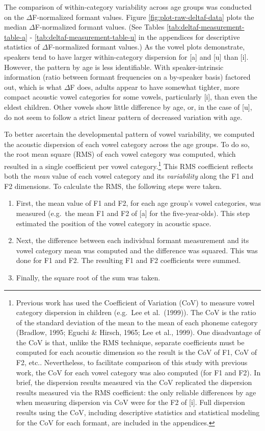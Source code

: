 \documentclass[
]{article}
\begin{document}
The comparison of within-category variability across age groups was conducted on the \(\Delta\)F-normalized formant values. Figure \ref{fig:plot-raw-deltaf-data} plots the median \(\Delta\)F-normalized formant values. (See Tables \ref{tab:deltaf-measurement-table-a} - \ref{tab:deltaf-measurement-table-u} in the appendices for descriptive statistics of \(\Delta\)F-normalized formant values.) As the vowel plots demonstrate, speakers tend to have larger within-category dispersion for {[}a{]} and {[}u{]} than {[}i{]}. However, the pattern by age is less identifiable. With speaker-intrinsic information (ratio between formant frequencies on a by-speaker basis) factored out, which is what \(\Delta\)F does, adults appear to have somewhat tighter, more compact acoustic vowel categories for some vowels, particularly {[}i{]}, than even the eldest children. Other vowels show little difference by age, or, in the case of {[}u{]}, do not seem to follow a strict linear pattern of decreased variation with age.

To better ascertain the developmental pattern of vowel variability, we computed the acoustic dispersion of each vowel category across the age groups. To do so, the root mean square (RMS) of each vowel category was computed, which resulted in a single coefficient per vowel category.\footnote{Previous work has used the Coefficient of Variation (CoV) to measure vowel category dispersion in children (e.g.~Lee et al.~(1999)). The CoV is the ratio of the standard deviation of the mean to the mean of each phoneme category (Bradlow, 1995; Eguchi \& Hirsch, 1965; Lee et al., 1999). One disadvantage of the CoV is that, unlike the RMS technique, separate coefficients must be computed for each acoustic dimension so the result is the CoV of F1, CoV of F2, etc.. Nevertheless, to facilitate comparison of this study with previous work, the CoV for each vowel category was also computed (for F1 and F2). In brief, the dispersion results measured via the CoV replicated the dispersion results measured via the RMS coefficient: the only reliable differences by age when measuring dispersion via CoV were for the F2 of {[}i{]}. Full dispersion results using the CoV, including descriptive statistics and statistical modeling for the CoV for each formant, are included in the appendices.} This RMS coefficient reflects both the \emph{mean} value of each vowel category and its \emph{variability} along the F1 and F2 dimensions. To calculate the RMS, the following steps were taken.

\begin{enumerate}
\def\labelenumi{\arabic{enumi}.}
\item
  First, the mean value of F1 and F2, for each age group's vowel categories, was measured (e.g.~the mean F1 and F2 of {[}a{]} for the five-year-olds). This step estimated the position of the vowel category in acoustic space.
\item
  Next, the difference between each individual formant measurement and its vowel category mean was computed and the difference was squared. This was done for F1 and F2. The resulting F1 and F2 coefficients were summed.
\item
  Finally, the square root of the sum was taken.
\end{enumerate}
\end{document}
